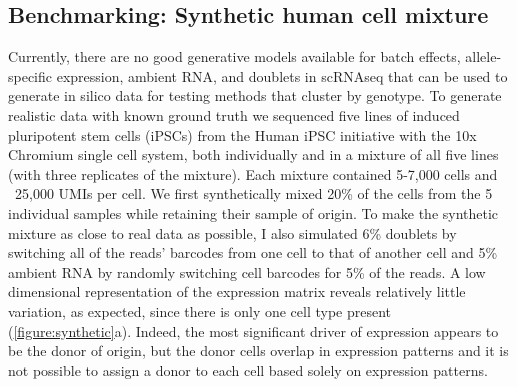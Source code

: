 \subsection{Benchmarking: Synthetic human cell mixture}

Currently, there are no good generative models available for batch effects, allele-specific expression, ambient RNA, and doublets in scRNAseq that can be used to generate in silico data for testing methods that cluster by genotype. To generate realistic data with known ground truth we sequenced five lines of induced pluripotent stem cells (iPSCs) from the Human iPSC initiative\cite{hipsci} with the 10x Chromium single cell system, both individually and in a mixture of all five lines (with three replicates of the mixture). Each mixture contained 5-7,000 cells and ~25,000 UMIs per cell. We first synthetically mixed 20\% of the cells from the 5 individual samples while retaining their sample of origin. To make the synthetic mixture as close to real data as possible, I also simulated 6\% doublets by switching all of the reads' barcodes from one cell to that of another cell and 5\% ambient RNA by randomly switching cell barcodes for 5\% of the reads. A low dimensional representation of the expression matrix reveals relatively little variation, as expected, since there is only one cell type present (\ref{figure:synthetic}a). Indeed, the most significant driver of expression appears to be the donor of origin, but the donor cells overlap in expression patterns and it is not possible to assign a donor to each cell based solely on expression patterns.



